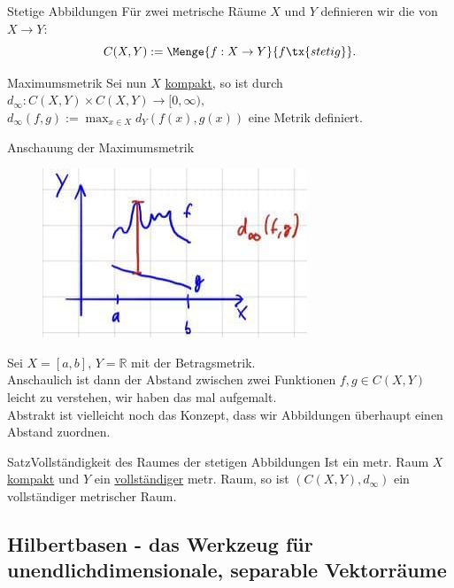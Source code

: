 \begin{Def}
{Stetige Abbildungen}
Für zwei metrische Räume $X$ und $Y$ definieren wir die  von $X\to Y$:
\begin{equation}
    C(X,Y):=\Menge{f:X\to Y}{f\tx{ stetig}}.
\end{equation}
\end{Def}
\begin{Def}
{Maximumsmetrik}
Sei nun $X$ \underline{kompakt}, so ist durch $d_\infty: C(X,Y)\times C(X,Y)\to [0,\infty),$\\$d_\infty(f,g):=\max_{x\in X}d_Y(f(x),g(x))$ eine Metrik definiert.
\end{Def}
\begin{Beispiel}
{Anschauung der Maximumsmetrik}
\begin{figure}
 \vspace{-15pt}
\includegraphics[width=.25\textwidth]{Dateien/06/06Maximumsmetrik.jpg}
 \vspace{-15pt}
\end{figure}
Sei $X=[a,b],\, Y=\mathbb{R}$ mit der Betragsmetrik.\\
Anschaulich ist dann der Abstand zwischen zwei Funktionen $f,g\in C(X,Y)$ leicht zu verstehen, wir haben das mal aufgemalt.\\
Abstrakt ist vielleicht noch das Konzept, dass wir Abbildungen überhaupt einen Abstand zuordnen.
\end{Beispiel}

\begin{Satz}
{Satz}{Vollständigkeit des Raumes der stetigen Abbildungen}
Ist ein metr. Raum $X$ \underline{kompakt} und $Y$ ein \underline{vollständiger} metr. Raum, so ist $(C(X,Y),d_\infty)$ ein vollständiger metrischer Raum.
\end{Satz}



\subsection{Hilbertbasen - das Werkzeug für unendlichdimensionale, separable Vektorräume}
